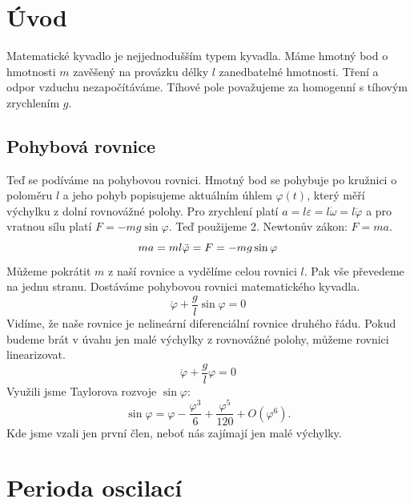 \section{Úvod}
\label{sec:Úvod}

Matematické kyvadlo je nejjednodušším typem kyvadla. Máme hmotný bod o hmotnosti $m$ zavěšený na provázku délky $l$ zanedbatelné hmotnosti. Tření a odpor vzduchu nezapočítáváme. Tíhové pole považujeme za homogenní s tíhovým zrychlením $g$.

\subsection*{Pohybová rovnice}
\label{sec:Pohybová rovnice}
Teď se podíváme na pohybovou rovnici. Hmotný bod se pohybuje po kružnici o poloměru $l$ a jeho pohyb popisujeme aktuálním úhlem $\varphi(t)$, který měří výchylku z dolní rovnovážné polohy. Pro zrychlení platí $a=l\varepsilon=l\dot{\omega}=l\ddot{\varphi}$ a pro vratnou sílu platí $F=-mg\sin\varphi$. Teď použijeme 2. Newtonův zákon: $F=ma$.
\begin{equation*}
ma=ml\ddot{\varphi}=F=-mg\sin\varphi\\
\end{equation*}
Můžeme pokrátit $m$ z naší rovnice a vydělíme celou rovnici $l$. Pak vše převedeme na jednu stranu. Dostáváme pohybovou rovnici matematického kyvadla.
\begin{equation}
\label{pohyb}
\boxed{\ddot{\varphi}+\frac{g}{l}\sin\varphi=0}
\end{equation}
Vidíme, že naše rovnice je nelineární diferenciální rovnice druhého řádu. Pokud budeme brát v úvahu jen malé výchylky z rovnovážné polohy, můžeme rovnici linearizovat.
\begin{equation}
\ddot{\varphi}+\frac{g}{l}\varphi=0
\end{equation}
Využili jsme Taylorova rozvoje $\sin\varphi$:
\begin{equation*}
\sin\varphi = \varphi-\frac{\varphi^3}{6}+\frac{\varphi^5}{120}+O\left(\varphi^6\right).
\end{equation*}
Kde jsme vzali jen první člen, neboť nás zajímají jen malé výchylky.

\section{Perioda oscilací}
\label{sec:Perioda oscilací}

